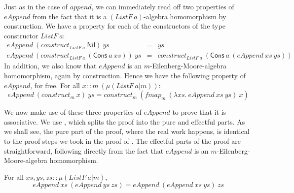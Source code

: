 Just as in the case of $\mathit{append}$, we can immediately read off
two properties of $\mathit{eAppend}$ from the fact that it is a
$(\mathit{ListF}~a)$-algebra homomorphism by construction. We have a
property for each of the constructors of the type constructor
$\mathit{ListF}~a$:
\begin{displaymath}
  \begin{array}{rcl}
    \mathit{eAppend}~(\mathit{construct}_{\mathit{ListF}~a}~\mathsf{Nil})~\mathit{ys} & = & \mathit{ys} \\
    \mathit{eAppend}~(\mathit{construct}_{\mathit{ListF}~a}~(\mathsf{Cons}~a~\mathit{xs}))~\mathit{ys} & = & \mathit{construct}_{\mathit{ListF}~a}~(\mathsf{Cons}~a~(\mathit{eAppend}~\mathit{xs}~\mathit{ys}))
  \end{array}
\end{displaymath}
In addition, we also know that $\mathit{eAppend}$ is an
$m$-Eilenberg-Moore-algebra homomorphism, again by construction. Hence
we have the following property of $\mathit{eAppend}$, for free. For
all $x :: m~(\mu(\mathit{ListF}~a|m))$:
\begin{displaymath}
  \mathit{eAppend}~(\mathit{construct}_m~\mathit{x})~\mathit{ys} = \mathit{construct}_m~(\mathit{fmap}_m~(\lambda \mathit{xs}.~\mathit{eAppend}~\mathit{xs}~\mathit{ys})~\mathit{x})
\end{displaymath}

We now make use of these three properties of $\mathit{eAppend}$ to
prove that it is associative. We use
, which splits the proof into the
pure and effectful parts. As we shall see, the pure part of the proof,
where the real work happens, is identical to the proof steps we took
in the proof of . The effectful parts of
the proof are straightforward, following directly from the fact that
$\mathit{eAppend}$ is an $m$-Eilenberg-Moore-algebra homomorphism.

\begin{theorem}
  For all $\mathit{xs}, \mathit{ys}, \mathit{zs} :: \mu(\mathit{ListF}~a|m)$,
  \begin{displaymath}
    \mathit{eAppend}~\mathit{xs}~(\mathit{eAppend}~\mathit{ys}~\mathit{zs}) = \mathit{eAppend}~(\mathit{eAppend}~\mathit{xs}~\mathit{ys})~\mathit{zs}
  \end{displaymath}
\end{theorem}

